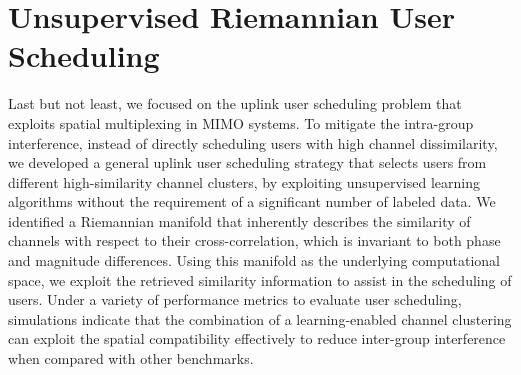\section{Unsupervised Riemannian User Scheduling}
Last but not least, we focused on the uplink user scheduling problem that exploits spatial multiplexing in MIMO systems. To mitigate the intra-group interference, instead of directly scheduling users with high channel dissimilarity, we developed a general uplink user scheduling strategy that selects users from different high-similarity channel clusters, by exploiting unsupervised learning algorithms without the requirement of a significant number of labeled data. We identified a Riemannian manifold that inherently describes the similarity of channels with respect to their cross-correlation, which is invariant to both phase and magnitude differences. Using this manifold as the underlying computational space, we exploit the retrieved similarity information to assist in the scheduling of users.
Under a variety of performance metrics to evaluate user scheduling, simulations indicate that the combination of a learning-enabled channel clustering can exploit the spatial compatibility effectively to reduce inter-group interference when compared with other benchmarks. 


